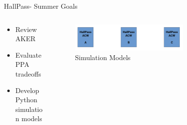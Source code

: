 \begin{frame}{HallPass- Summer Goals}
    \begin{columns}
        \begin{column}{0.5\textwidth}
            \begin{itemize}
                \item Review AKER
                \item Evaluate PPA tradeoffs
                \item Develop Python simulation models
            \end{itemize}
        \end{column}
        \begin{column}{0.5\textwidth}
            \begin{figure}
                \centering
                \includegraphics[height=0.7\textheight,width=0.7\textwidth,keepaspectratio]{goals.png}
                \caption{Simulation Models}
            \end{figure}
        \end{column}
    \end{columns}
\end{frame}